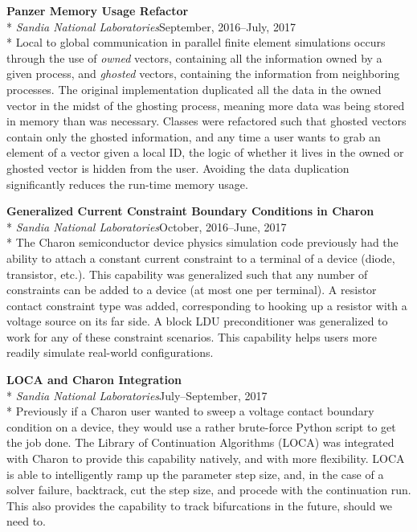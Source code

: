 \documentclass[margin,line,pifont,palatino,10pt]{res}
\begin{document}
\begin{resume}
{\bf Panzer Memory Usage Refactor}\\*
{\it Sandia National Laboratories}\hfill September, 2016--July, 2017\\*
Local to global communication in parallel finite element simulations occurs through the use of \emph{owned} vectors, containing all the information owned by a given process, and \emph{ghosted} vectors, containing the information from neighboring processes.  The original implementation duplicated all the data in the owned vector in the midst of the ghosting process, meaning more data was being stored in memory than was necessary.  Classes were refactored such that ghosted vectors contain only the ghosted information, and any time a user wants to grab an element of a vector given a local ID, the logic of whether it lives in the owned or ghosted vector is hidden from the user.  Avoiding the data duplication significantly reduces the run-time memory usage.

{\bf Generalized Current Constraint Boundary Conditions in Charon}\\*
{\it Sandia National Laboratories}\hfill October, 2016--June, 2017\\*
The Charon semiconductor device physics simulation code previously had the ability to attach a constant current constraint to a terminal of a device (diode, transistor, etc.).  This capability was generalized such that any number of constraints can be added to a device (at most one per terminal).  A resistor contact constraint type was added, corresponding to hooking up a resistor with a voltage source on its far side.  A block LDU preconditioner was generalized to work for any of these constraint scenarios.  This capability helps users more readily simulate real-world configurations.

{\bf LOCA and Charon Integration}\\*
{\it Sandia National Laboratories}\hfill July--September, 2017\\*
Previously if a Charon user wanted to sweep a voltage contact boundary condition on a device, they would use a rather brute-force Python script to get the job done.  The Library of Continuation Algorithms (LOCA) was integrated with Charon to provide this capability natively, and with more flexibility.  LOCA is able to intelligently ramp up the parameter step size, and, in the case of a solver failure, backtrack, cut the step size, and procede with the continuation run.  This also provides the capability to track bifurcations in the future, should we need to.


\end{resume}
\end{document}
